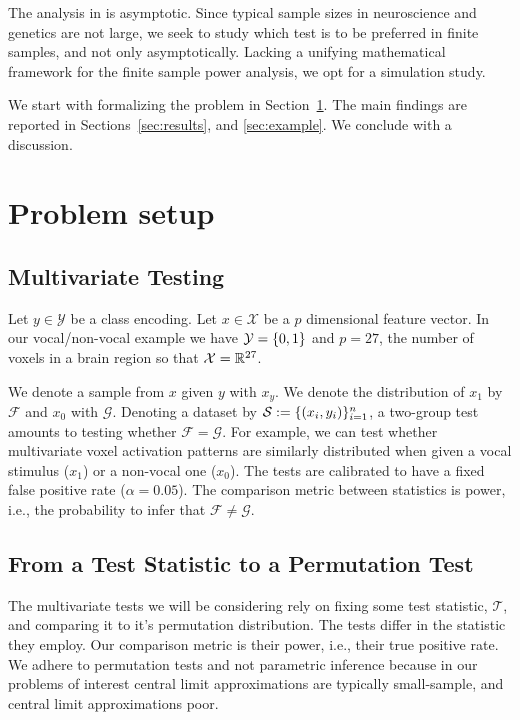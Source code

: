 \documentclass[journal]{IEEEtran}
\begin{document}
The analysis in \cite{ramdas_classification_2016} is asymptotic. 
Since typical sample sizes in neuroscience and genetics are not large, we seek to study which test is to be preferred in finite samples, and not only asymptotically.
Lacking a unifying mathematical framework for the finite sample power analysis, we opt for a simulation study. 

We start with formalizing the problem in Section~\ref{sec:problem_setup}.
The main findings are reported in Sections~\ref{sec:results}, and \ref{sec:example}.
We conclude with a discussion.







\section{Problem setup}
\label{sec:problem_setup}


\subsection{Multivariate Testing}

Let $y \in \mathcal{Y}$ be a class encoding. 
Let $x \in \mathcal{X}$ be a $p$ dimensional feature vector. 
In our vocal/non-vocal example we have $\mathcal{Y}=\{ 0,1 \}$ and $p=27$, the number of voxels in a brain region so that $\mathcal{X}=\mathbb{R}^{27}$. 

We denote a sample from $x$ given $y$ with $x_y$.
We denote the distribution of $x_1$ by $\mathcal{F}$ and $x_0$ with $\mathcal{G}$.
Denoting a dataset by $\mathcal{S}:=\{(x_i,y_i)\}_{i=1}^n$, a two-group test amounts to testing whether $\mathcal{F}=\mathcal{G}$.
For example, we can test whether multivariate voxel activation patterns are similarly distributed when given a vocal stimulus ($x_1$) or a non-vocal one ($x_0$).
The tests are calibrated to have a fixed false positive rate ($\alpha=0.05$).
The comparison metric between statistics is power, i.e., the probability to infer that $\mathcal{F}\neq\mathcal{G}$.


\subsection{From a Test Statistic to a Permutation Test}

The multivariate tests we will be considering rely on fixing some test statistic, $\mathcal{T}$, and comparing it to it's permutation distribution. 
The tests differ in the statistic they employ.
Our comparison metric is their power, i.e., their true positive rate. 
We adhere to permutation tests and not parametric inference because in our problems of interest central limit approximations are typically small-sample, and central limit approximations poor.
\end{document}
